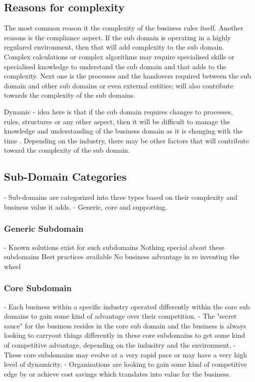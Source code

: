 \documentclass[a4paper, 11pt]{book}
\begin{document}
    \subsection{Reasons for complexity}
    The most common reason it the complexity of the business rules itself.
    Another reasons is the compliance aspect.
    If the sub domain is operating in a highly regulared environment, then that will add complexity to the sub domain.
    Complex calculations or complex algorithms may require specialised skills or specialised knowledge to understand the sub domain and that adds to the complexity.
    Next one is the processes and the handovers required between the sub domain and other sub domains or even external entities; will also contribute towards the complexity of the sub domains.

    Dynamic - idea here is that if the sub domain requires changes to processes, rules, structures or any other aspect, then it will be difficult to manage the knowledge and understanding of the business domain as it is changing with the time .
    Depending on the industry, there may be other factors that will contribute toward the complexity of the sub domain.

    \subsection{Sub-Domain Categories}
    - Sub-domains are categorized into three types based on their complexity and business value it adds.
    - Generic, core and supporting.

    \subsubsection{Generic Subdomain}
    - Known solutions exist for such subdomains
    Nothing special about these subdomains
    Best practices available
    No business advantage in re inventing the wheel

    \subsubsection{Core Subdomain}
    - Each business within a specific industry operated differently within the core sub domains to gain some kind of advantage over their competition.
    - The "secret sauce" for the business resides in the core sub domain and the business is always looking to carryout things differently in these core subdomains to get some kind of competitive advantage, depending on the indusitry and the environment.
    - These core subdomains may evolve at a very rapid pace or may have a very high level of dynamicity.
    - Organisations are looking to gain some kind of competitive edge by or achieve cost savings which translates into value for the business.
\end{document}
